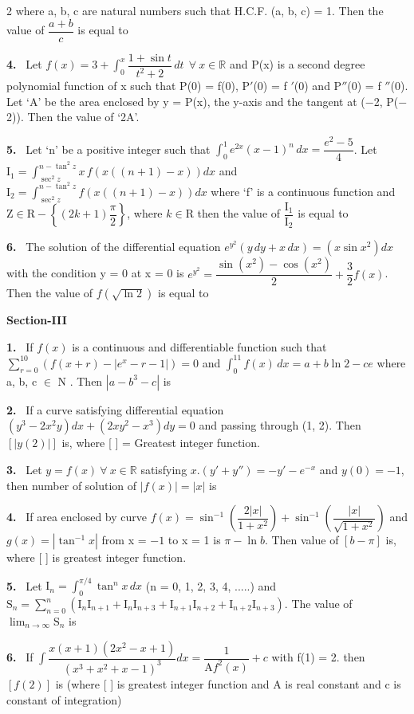 \documentclass[10pt]{extarticle}
\newcommand{\sect}[1]{\par\smallskip\noindent\textbf{#1}\par}
\newcommand{\qn}[1]{\par\smallskip\noindent\textbf{#1.}~}
\begin{document}
\begin{multicols}{2}
where a, b, c are natural numbers such that H.C.F. (a, b, c) = 1. Then the value of $\dfrac{a+b}{c}$ is equal to
\qn{4} Let $f(x)=3+\displaystyle\int_0^x\dfrac{1+\sin t}{t^2+2}\,dt\ \ \forall\ x\in\mathbb{R}$ and P(x) is a second degree polynomial function of x such that P(0) = f(0), P$'$(0) = f $'$(0) and P$''$(0) = f $''$(0). Let `A' be the area enclosed by y = P(x), the y-axis and the tangent at ($-$2, P($-$2)). Then the value of `2A'.
\qn{5} Let `n' be a positive integer such that $\displaystyle\int_0^1 e^{2x}(x-1)^n\,dx=\dfrac{e^2-5}{4}$. Let $\mathrm I_1=\displaystyle\int_{\sec^2z}^{n-\tan^2z}x\,f\left(x((n+1)-x)\right)dx$ and $\mathrm I_2=\displaystyle\int_{\sec^2z}^{n-\tan^2z}f\left(x((n+1)-x)\right)dx$ where `f' is a continuous function and $\mathrm Z\in\mathrm R-\left\{(2k+1)\dfrac\pi2\right\}$, where $k\in\mathrm R$ then the value of $\dfrac{\mathrm I_1}{\mathrm I_2}$ is equal to
\qn{6} The solution of the differential equation $e^{y^2}(y\,dy+x\,dx)=\left(x\sin x^2\right)dx$ with the condition y = 0 at x = 0 is $e^{y^2}=\dfrac{\sin\left(x^2\right)-\cos\left(x^2\right)}{2}+\dfrac32f(x)$. Then the value of $f\left(\sqrt{\ln2}\right)$ is equal to
\sect{Section-III}
\qn{1} If $f(x)$ is a continuous and differentiable function such that $\displaystyle\sum_{r=0}^{10}\left(f(x+r)-\left|e^x-r-1\right|\right)=0$ and $\displaystyle\int_0^{11}f(x)\,dx=a+b\ln2-ce$ where a, b, c $\in$ N . Then $\left|a-b^3-c\right|$ is
\qn{2} If a curve satisfying differential equation $\left(y^3-2x^2y\right)dx+\left(2xy^2-x^3\right)dy=0$ and passing through (1, 2). Then $[|y(2)|]$ is, where [ ] = Greatest integer function.
\qn{3} Let $y=f(x)\ \forall\ x\in\mathbb{R}$ satisfying $x.\left(y'+y''\right)=-y'-e^{-x}$ and $y(0)=-1$, then number of solution of $|f(x)|=|x|$ is
\qn{4} If area enclosed by curve $f(x)=\sin^{-1}\left(\dfrac{2|x|}{1+x^2}\right)+\sin^{-1}\left(\dfrac{|x|}{\sqrt{1+x^2}}\right)$ and $g(x)=\left|\tan^{-1}x\right|$ from x = $-1$ to x = 1 is $\pi-\ln b$. Then value of $[b-\pi]$ is, where [ ] is greatest integer function.
\qn{5} Let $\mathrm I_n=\displaystyle\int_0^{\pi/4}\tan^nx\,dx$ (n = 0, 1, 2, 3, 4, .....) and $\mathrm S_n=\displaystyle\sum_{n=0}^{n}\left(\mathrm I_n\mathrm I_{n+1}+\mathrm I_n\mathrm I_{n+3}+\mathrm I_{n+1}\mathrm I_{n+2}+\mathrm I_{n+2}\mathrm I_{n+3}\right)$. The value of $\displaystyle\lim_{n\to\infty}\mathrm S_n$ is
\qn{6} If $\displaystyle\int\dfrac{x(x+1)\left(2x^2-x+1\right)}{\left(x^3+x^2+x-1\right)^3}dx=\dfrac{1}{\mathrm Af^2(x)}+c$ with f(1) = 2. then $[f(2)]$ is (where [ ] is greatest integer function and A is real constant and c is constant of integration)
\end{multicols}
\end{document}
